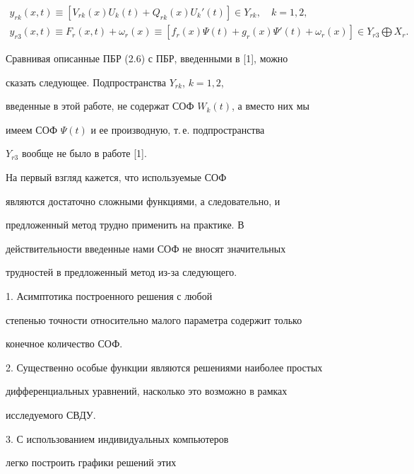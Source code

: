 \begin{gather}


y_{rk} (x,t) \equiv [ V_{rk} (x) U_k (t) +


Q_{rk} (x) U_k ' (t)] \in Y_{rk}, \quad k=1,2,\\


%


y_{r3} (x,t) \equiv F_r (x,t) + \omega_r (x) \equiv [ f_r (x) {\Psi} (t) +


g_{r} (x) \Psi ' (t) + \omega_r (x)] \in Y_{r3} \bigoplus X_r.


\end{gather}


Сравнивая описанные ПБР (2.6) с ПБР, введенными в [1], можно


сказать следующее. Подпространства $ Y_{rk}$, $k=1,2$,


введенные в этой работе, не содержат СОФ $W_k(t)$, а вместо них мы


имеем СОФ $\Psi (t)$ и ее производную, т.\,е. подпространства


$Y_{r3}$ вообще не было в работе [1].





На первый взгляд кажется, что используемые СОФ


являются достаточно сложными функциями, а следовательно, и


предложенный метод трудно применить на практике. В


действительности введенные нами СОФ не вносят значительных


трудностей в предложенный метод из-за следующего.





1. Асимптотика построенного решения с любой


степенью точности относительно малого параметра содержит только


конечное количество СОФ.





2. Существенно особые функции являются решениями наиболее простых


дифференциальных уравнений, насколько это возможно в рамках


исследуемого СВДУ.





3. С использованием индивидуальных компьютеров 


легко построить графики решений этих


